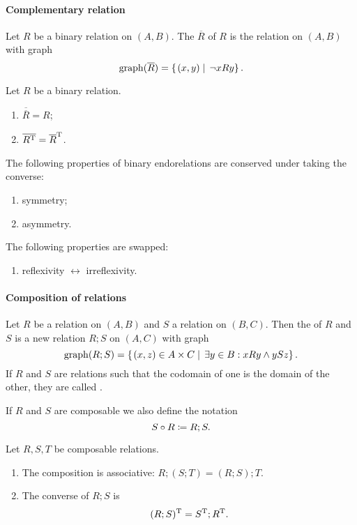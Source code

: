 \paragraph{Complementary relation}
\begin{definition}
Let $R$ be a binary relation on $(A, B)$. The  $\overline{R}$ of $R$ is the relation on $(A, B)$ with graph
\[ \operatorname{graph}(\overline{R}) = \left\{\left. (x,y) \;\right|\; \neg xRy \right\}. \]
\end{definition}
\begin{lemma}
Let $R$ be a binary relation.
\begin{enumerate}
\item $\overline{\overline{R}} = R$;
\item $\overline{R^{\mathrm{T}}} = \overline{R}^{\mathrm{T}}$.
\end{enumerate}
\end{lemma}
\begin{lemma}
The following properties of binary endorelations are conserved under taking the converse:
\begin{enumerate}
\item symmetry;
\item asymmetry.
\end{enumerate}
The following properties are swapped:
\begin{enumerate}
\item reflexivity $\leftrightarrow$ irreflexivity.
\end{enumerate}
\end{lemma}
\paragraph{Composition of relations}
\begin{definition}
Let $R$ be a relation on $(A, B)$ and $S$ a relation on $(B, C)$. Then the  of $R$ and $S$ is a new relation $R;S$ on $(A, C)$ with graph
\[ \operatorname{graph}(R;S) = \left\{\left. (x,z)\in A\times C \;\right|\; \exists y\in B: xRy \land ySz \right\}. \]
If $R$ and $S$ are relations such that the codomain of one is the domain of the other, they are called .

If $R$ and $S$ are composable we also define the notation
\[ S\circ R \coloneqq R;S. \]
\end{definition}
\begin{lemma}
Let $R,S,T$ be composable relations.
\begin{enumerate}
\item The composition is associative: $R;(S;T) = (R;S);T$.
\item The converse of $R;S$ is
\[ (R;S)^{\mathrm{T}} = S^{\mathrm{T}} ; R^{\mathrm{T}}. \]
\end{enumerate}
\end{lemma}

